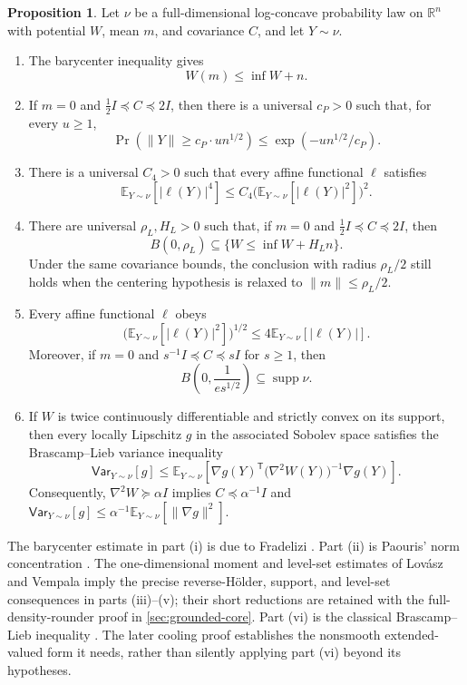 \documentclass[11pt]{article}
\numberwithin{equation}{section}
\theoremstyle{definition}
\newtheorem{proposition}[proposition]{Proposition}
\newcommand{\E}[2]{\mathbb{E}_{#1}\left[#2\right]}
\newcommand{\V}[2]{\mathsf{Var}_{#1}\left[#2\right]}
\begin{document}
\begin{proposition}
\label{prop:log-concave-toolkit}
Let $\nu$ be a full-dimensional log-concave probability law on
$\mathbb R^n$ with potential
$W$, mean
$m$, and covariance
$C$, and let
$Y\sim\nu$.
\begin{enumerate}[label=\textnormal{(\roman*)}]
\item \label{itm:log-concave-toolkit:1} The barycenter inequality gives
\[
 W(m)\leq\inf W+n.
\]
\item \label{itm:log-concave-toolkit:2} If $m=0$ and
  $\frac12I\preceq C\preceq2I$, then there is a universal
  $c_P>0$ such that, for every
  $u\geq1$,
\[
 \Pr\!\left(\|Y\|\geq c_P \cdot un^{1/2}\right)
 \leq \exp(-un^{1/2}/c_P).
\]
\item \label{itm:log-concave-toolkit:3} There is a universal $C_4>0$ such that
  every affine functional
  $\ell$ satisfies
\[
 \E{Y\sim\nu}{|\ell(Y)|^4}
 \leq C_4\bigl(\E{Y\sim\nu}{|\ell(Y)|^2}\bigr)^2.
\]
\item \label{itm:log-concave-toolkit:4} There are universal $\rho_L,H_L>0$ such
  that, if
  $m=0$ and
  $\frac12I\preceq C\preceq2I$, then
\[
 B(0,\rho_L)\subseteq\{W\leq\inf W+H_Ln\}.
\]
Under the same covariance bounds, the conclusion with radius $\rho_L/2$ still
holds when the centering hypothesis is relaxed to
$\|m\|\leq\rho_L/2$.
\item \label{itm:log-concave-toolkit:5} Every affine functional $\ell$ obeys
\[
 \bigl(\E{Y\sim\nu}{|\ell(Y)|^2}\bigr)^{1/2}
 \leq4\E{Y\sim\nu}{|\ell(Y)|}.
\]
Moreover, if $m=0$ and
$s^{-1}I\preceq C\preceq sI$ for
$s\geq1$, then
\[
 B\!\left(0,\frac{1}{es^{1/2}}\right)
 \subseteq\operatorname{supp}\nu.
\]
\item \label{itm:log-concave-toolkit:6} If $W$ is twice continuously
  differentiable and strictly convex on its support, then every locally Lipschitz
  $g$ in the associated Sobolev space satisfies the Brascamp--Lieb variance
  inequality
\[
 \V{Y\sim\nu}{g}
 \leq\E{Y\sim\nu}{
 \nabla g(Y)^{\mathsf T}
 \bigl(\nabla^2W(Y)\bigr)^{-1}\nabla g(Y)}.
\]
Consequently, $\nabla^2W\succeq\alpha I$ implies
$C\preceq\alpha^{-1}I$ and
$\V{Y\sim\nu}{g}\leq \alpha^{-1}\E{Y\sim\nu}{\|\nabla g\|^2}$.
\end{enumerate}
\end{proposition}

The barycenter estimate in part (i) is due to Fradelizi \cite{F97:journal}.
Part (ii) is Paouris' norm concentration \cite{P06:journal}.
The one-dimensional moment and level-set estimates of Lov\'asz and Vempala
\cite{LV07:journal} imply the precise reverse-H\"older, support, and level-set
consequences in parts (iii)--(v); their short reductions are retained with the
full-density-rounder proof in \cref{sec:grounded-core}.
Part (vi) is the classical Brascamp--Lieb inequality \cite{BL76:journal}.
The later cooling proof establishes the nonsmooth extended-valued form it needs,
rather than silently applying part (vi) beyond its hypotheses.
\end{document}
